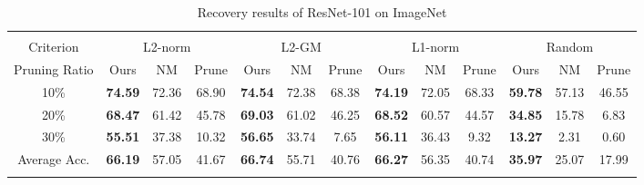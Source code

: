 \begin{table*}[t]
{\begin{tabular}{c||c|c|c||c|c|c||c|c|c||c|c|c}  \Xhline{2\arrayrulewidth}
\multicolumn{13}{c}{\textbf{ResNet101 - ImageNet (Acc. 77.31)}}
\\ \Xhline{2\arrayrulewidth} %
Criterion & \multicolumn{3}{c||}{L2-norm} & \multicolumn{3}{c||}{L2-GM} & \multicolumn{3}{c||}{L1-norm}& \multicolumn{3}{c}{Random}\\ \hline
Pruning Ratio& Ours& NM& Prune& Ours& NM& Prune& Ours& NM& Prune& Ours& NM& Prune
\\ \Xhline{2\arrayrulewidth}
10\%& \textbf{74.59} & 72.36 & 68.90 & \textbf{74.54} & 72.38 & 68.38 & \textbf{74.19} & 72.05 & 68.33 & \textbf{59.78} & 57.13 & 46.55 \\ \hline
20\%& \textbf{68.47} & 61.42 & 45.78 & \textbf{69.03} & 61.02 & 46.25 & \textbf{68.52} & 60.57 & 44.57 & \textbf{34.85} & 15.78 & 6.83  \\ \hline
30\%& \textbf{55.51} & 37.38 & 10.32 & \textbf{56.65} & 33.74 & 7.65  & \textbf{56.11} & 36.43 & 9.32  & \textbf{13.27} & 2.31  & 0.60  \\ \Xhline{2\arrayrulewidth}
Average Acc. & \textbf{66.19} & 57.05 & 41.67 & \textbf{66.74} & 55.71 & 40.76 & \textbf{66.27} & 56.35 & 40.74 & \textbf{35.97} & 25.07 & 17.99\\\Xhline{2\arrayrulewidth}
\end{tabular}
}
\vspace{-1.5mm}
\caption{Recovery results of ResNet-101 on ImageNet} \label{tab:ResNet101-ImageNet}
\vspace{1.5mm}
\end{table*}


